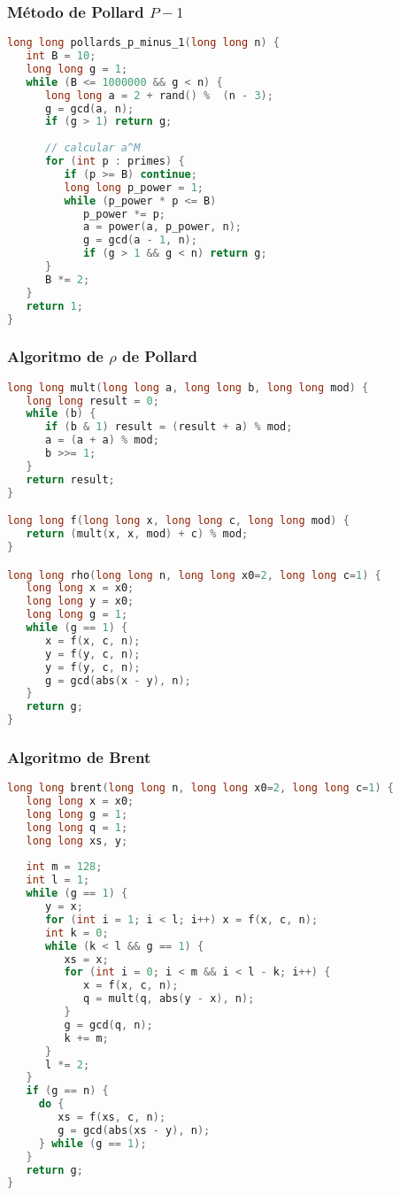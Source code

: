 \subsubsection{Método de Pollard $P-1$}
\begin{lstlisting}[language=C++]
long long pollards_p_minus_1(long long n) {
   int B = 10;
   long long g = 1;
   while (B <= 1000000 && g < n) {
      long long a = 2 + rand() %  (n - 3);
      g = gcd(a, n);
      if (g > 1) return g;
      
      // calcular a^M
      for (int p : primes) {
         if (p >= B) continue;
         long long p_power = 1;
         while (p_power * p <= B)
            p_power *= p;
            a = power(a, p_power, n);
			g = gcd(a - 1, n);
            if (g > 1 && g < n) return g;
      }
      B *= 2;
   }
   return 1;
}
\end{lstlisting}


\subsubsection{Algoritmo de $\rho$ de Pollard}
\begin{lstlisting}[language=C++]
long long mult(long long a, long long b, long long mod) {
   long long result = 0;
   while (b) {
      if (b & 1) result = (result + a) % mod;
      a = (a + a) % mod;
      b >>= 1;
   }
   return result;
}

long long f(long long x, long long c, long long mod) {
   return (mult(x, x, mod) + c) % mod;
}

long long rho(long long n, long long x0=2, long long c=1) {
   long long x = x0;
   long long y = x0;
   long long g = 1;
   while (g == 1) {
      x = f(x, c, n);
      y = f(y, c, n);
      y = f(y, c, n);
      g = gcd(abs(x - y), n);
   }
   return g;
}	
\end{lstlisting}


\subsubsection{Algoritmo de Brent}
\begin{lstlisting}[language=C++]
long long brent(long long n, long long x0=2, long long c=1) {
   long long x = x0;
   long long g = 1;
   long long q = 1;
   long long xs, y;
	
   int m = 128;
   int l = 1;
   while (g == 1) {
      y = x;
      for (int i = 1; i < l; i++) x = f(x, c, n);
      int k = 0;
      while (k < l && g == 1) {
         xs = x;
         for (int i = 0; i < m && i < l - k; i++) {
            x = f(x, c, n);
            q = mult(q, abs(y - x), n);
         }
         g = gcd(q, n);
         k += m;
      }
      l *= 2;
   }
   if (g == n) {
     do {
        xs = f(xs, c, n);
        g = gcd(abs(xs - y), n);
     } while (g == 1);
   }
   return g;
}
\end{lstlisting}


